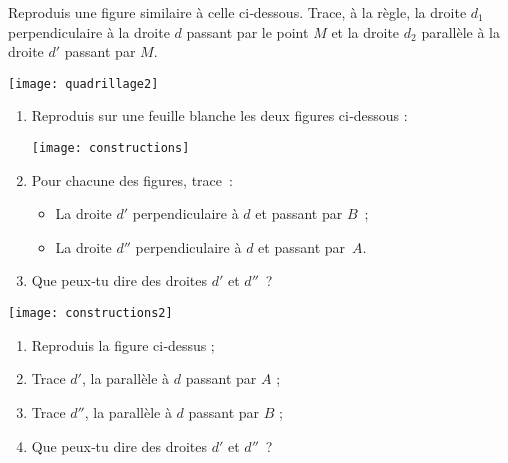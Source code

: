\begin{exercice}[Quadrillage]
Reproduis une figure similaire à celle ci‑dessous. Trace, à la règle, la droite $d_1$ perpendiculaire à la droite $d$ passant par le point $M$ et la droite $d_2$ parallèle à la droite $d'$ passant par $M$.
\begin{center} \texttt{[image: quadrillage2]}  \end{center}
\end{exercice}


\begin{exercice}[Constructions]
\begin{enumerate}
 \item Reproduis sur une feuille blanche les deux figures ci‑dessous :
 \begin{center} \texttt{[image: constructions]}  \end{center}
 \item Pour chacune des figures, trace :
  \begin{itemize}
   \item La droite $d'$ perpendiculaire à $d$ et passant par $B$ ;
   \item La droite $d''$ perpendiculaire à $d$ et passant par $A$.
   \end{itemize}
 \item Que peux‑tu dire des droites $d'$ et $d''$ ?
 \end{enumerate}
\end{exercice}


\begin{exercice}
 \begin{center} \texttt{[image: constructions2]}  \end{center}
\begin{enumerate}
 \item Reproduis la figure ci‑dessus ;
 \item Trace $d'$, la parallèle à $d$ passant par $A$ ;
 \item Trace $d''$, la parallèle à $d$ passant par $B$ ;
 \item Que peux‑tu dire des droites $d'$ et $d''$ ?
 \end{enumerate}
\end{exercice}


\newpage



